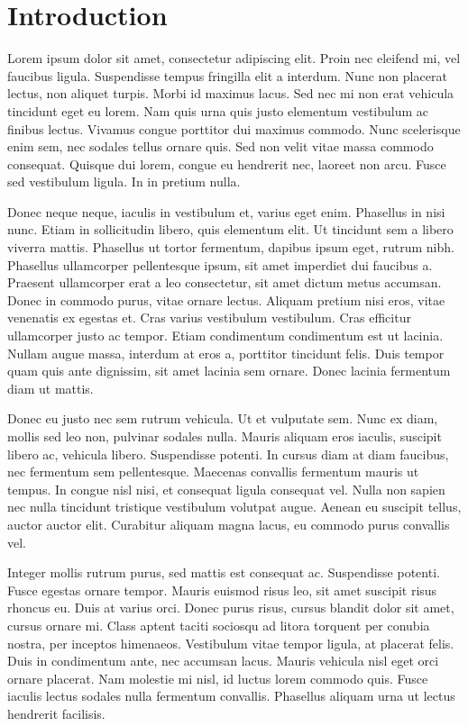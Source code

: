 \section{Introduction}

Lorem ipsum dolor sit amet, consectetur adipiscing elit. Proin nec eleifend mi, vel faucibus ligula. Suspendisse tempus fringilla elit a interdum. Nunc non placerat lectus, non aliquet turpis. Morbi id maximus lacus. Sed nec mi non erat vehicula tincidunt eget eu lorem. Nam quis urna quis justo elementum vestibulum ac finibus lectus. Vivamus congue porttitor dui maximus commodo. Nunc scelerisque enim sem, nec sodales tellus ornare quis. Sed non velit vitae massa commodo consequat. Quisque dui lorem, congue eu hendrerit nec, laoreet non arcu. Fusce sed vestibulum ligula. In in pretium nulla.

Donec neque neque, iaculis in vestibulum et, varius eget enim. Phasellus in nisi nunc. Etiam in sollicitudin libero, quis elementum elit. Ut tincidunt sem a libero viverra mattis. Phasellus ut tortor fermentum, dapibus ipsum eget, rutrum nibh. Phasellus ullamcorper pellentesque ipsum, sit amet imperdiet dui faucibus a. Praesent ullamcorper erat a leo consectetur, sit amet dictum metus accumsan. Donec in commodo purus, vitae ornare lectus. Aliquam pretium nisi eros, vitae venenatis ex egestas et. Cras varius vestibulum vestibulum. Cras efficitur ullamcorper justo ac tempor. Etiam condimentum condimentum est ut lacinia. Nullam augue massa, interdum at eros a, porttitor tincidunt felis. Duis tempor quam quis ante dignissim, sit amet lacinia sem ornare. Donec lacinia fermentum diam ut mattis.

Donec eu justo nec sem rutrum vehicula. Ut et vulputate sem. Nunc ex diam, mollis sed leo non, pulvinar sodales nulla. Mauris aliquam eros iaculis, suscipit libero ac, vehicula libero. Suspendisse potenti. In cursus diam at diam faucibus, nec fermentum sem pellentesque. Maecenas convallis fermentum mauris ut tempus. In congue nisl nisi, et consequat ligula consequat vel. Nulla non sapien nec nulla tincidunt tristique vestibulum volutpat augue. Aenean eu suscipit tellus, auctor auctor elit. Curabitur aliquam magna lacus, eu commodo purus convallis vel.

Integer mollis rutrum purus, sed mattis est consequat ac. Suspendisse potenti. Fusce egestas ornare tempor. Mauris euismod risus leo, sit amet suscipit risus rhoncus eu. Duis at varius orci. Donec purus risus, cursus blandit dolor sit amet, cursus ornare mi. Class aptent taciti sociosqu ad litora torquent per conubia nostra, per inceptos himenaeos. Vestibulum vitae tempor ligula, at placerat felis. Duis in condimentum ante, nec accumsan lacus. Mauris vehicula nisl eget orci ornare placerat. Nam molestie mi nisl, id luctus lorem commodo quis. Fusce iaculis lectus sodales nulla fermentum convallis. Phasellus aliquam urna ut lectus hendrerit facilisis.

